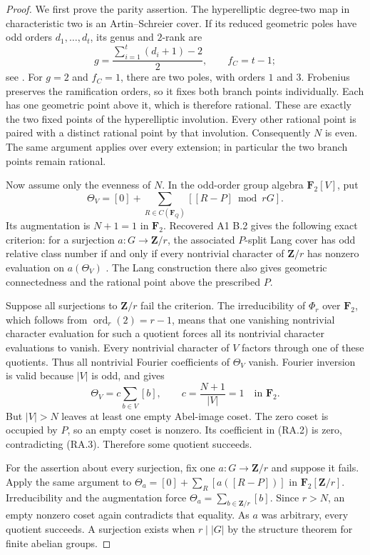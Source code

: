 \begin{proof}
We first prove the parity assertion.  The hyperelliptic
degree-two map in characteristic two is an Artin--Schreier
cover.  If its reduced geometric poles have odd orders
$d_1,\ldots,d_t$, its genus and $2$-rank are
\[
       g=\frac{\sum_{i=1}^t(d_i+1)-2}{2},
       \qquad f_C=t-1;
\]
see \cite[Lemma~2.6, p.~712]{PriesZhu2012}.
For $g=2$ and $f_C=1$, there are two poles, with
orders $1$ and $3$.  Frobenius preserves the ramification
orders, so it fixes both branch points individually.
Each has one geometric point above it, which is therefore
rational.  These are exactly the two fixed points of the
hyperelliptic involution.  Every other rational point is
paired with a distinct rational point by that involution.
Consequently $N$ is even.  The same argument applies over
every extension; in particular the two branch points remain
rational.

Now assume only the evenness of $N$.
In the odd-order group algebra $\mathbf F_2[V]$, put
\[
 \Theta_V=[0]+\sum_{R\in C(\mathbf F_Q)}[[R-P]\bmod rG].
\tag{RA.2}
\]
Its augmentation is $N+1=1$ in $\mathbf F_2$.
Recovered A1 B.2 gives the following exact criterion:
for a surjection $a:G\to\mathbf Z/r$, the associated
$P$-split Lang cover has odd relative class number if and
only if every nontrivial character of $\mathbf Z/r$ has
nonzero evaluation on $a(\Theta_V)$
\cite[B.2]{A1run}.
The Lang construction there also gives geometric
connectedness and the rational point above the prescribed
$P$.

Suppose all surjections to $\mathbf Z/r$ fail the criterion.
The irreducibility of $\Phi_r$ over $\mathbf F_2$, which
follows from $\operatorname{ord}_r(2)=r-1$, means that
one vanishing nontrivial character evaluation for such a
quotient forces all its nontrivial character evaluations
to vanish.  Every nontrivial character of $V$ factors
through one of these quotients.  Thus all nontrivial
Fourier coefficients of $\Theta_V$ vanish.
Fourier inversion is valid because $|V|$ is odd, and gives
\[
        \Theta_V=c\sum_{b\in V}[b],\qquad
        c=\frac{N+1}{|V|}=1\quad\text{in }\mathbf F_2.
\tag{RA.3}
\]
But $|V|>N$ leaves at least one empty Abel-image coset.
The zero coset is occupied by $P$, so an empty coset is
nonzero.  Its coefficient in (RA.2) is zero, contradicting
(RA.3).  Therefore some quotient succeeds.

For the assertion about every surjection, fix one
$a:G\to\mathbf Z/r$ and suppose it fails.
Apply the same argument to
$\Theta_a=[0]+\sum_R[a([R-P])]$ in
$\mathbf F_2[\mathbf Z/r]$.
Irreducibility and the augmentation force
$\Theta_a=\sum_{b\in\mathbf Z/r}[b]$.
Since $r>N$, an empty nonzero coset again contradicts
that equality.  As $a$ was arbitrary, every quotient
succeeds.  A surjection exists when $r\mid|G|$ by the
structure theorem for finite abelian groups.
\end{proof}

